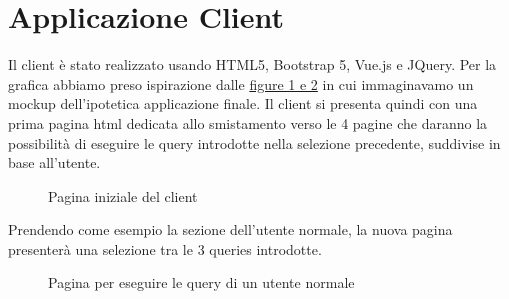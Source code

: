 \documentclass[12pt]{article}
\begin{document}
\newpage
\section{Applicazione Client}
Il client è stato realizzato usando HTML5, Bootstrap 5, Vue.js e JQuery. Per la grafica abbiamo preso ispirazione dalle \hyperref[sec:mockupFinali]{figure 1 e 2} in cui immaginavamo un mockup dell'ipotetica applicazione finale.
\newline
Il client si presenta quindi con una prima pagina html dedicata allo smistamento verso le 4 pagine che daranno la possibilità di eseguire le query introdotte nella selezione precedente, suddivise in base all'utente. 
\begin{figure}[H]
    \caption{Pagina iniziale del client}
\end{figure}
Prendendo come esempio la sezione dell'utente normale, la nuova pagina presenterà una selezione tra le 3 queries introdotte.
\begin{figure}[H]
    \caption{Pagina per eseguire le query di un utente normale}
\end{figure}
\end{document}

